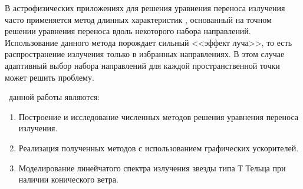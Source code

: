 В астрофизических приложениях для решения уравнения переноса излучения часто применяется метод длинных характеристик \cite{vladimirov1961}, основанный на точном решении уравнения переноса вдоль некоторого набора направлений. Использование данного метода порождает сильный <<эффект луча>>, то есть распространение излучения только в избранных направлениях. В этом случае адаптивный выбор набора направлений \cite{Galanin2010} для каждой пространственной точки может решить проблему. 
\fi

 \aim\ данной работы являются:
\begin{enumerate}
  \item Построение и исследование численных методов решения уравнения переноса излучения.
  \item Реализация полученных методов с использованием графических ускорителей.
  \item Моделирование линейчатого спектра излучения звезды типа Т Тельца при наличии конического ветра. 
\end{enumerate}

